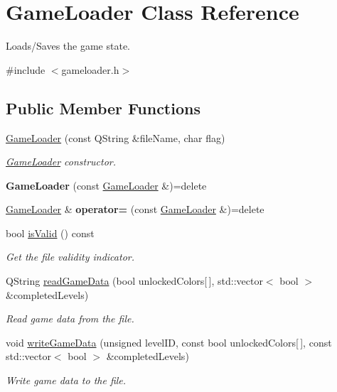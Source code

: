 \hypertarget{class_game_loader}{}\section{Game\+Loader Class Reference}
\label{class_game_loader}


Loads/\+Saves the game state.  




{\ttfamily \#include $<$gameloader.\+h$>$}

\subsection*{Public Member Functions}
\begin{DoxyCompactItemize}
\item 
\hyperlink{class_game_loader_af775cdf000a140a8a977d75ef191837d}{Game\+Loader} (const Q\+String \&file\+Name, char flag)
\begin{DoxyCompactList}\small\item\em \hyperlink{class_game_loader}{Game\+Loader} constructor. \end{DoxyCompactList}\item 
\mbox{\label{class_game_loader_ad0cd1a830dde408ea6951f3ef3237f6e}} 
{\bfseries Game\+Loader} (const \hyperlink{class_game_loader}{Game\+Loader} \&)=delete
\item 
\mbox{\label{class_game_loader_a7ffc953ad4a2ca243babdd82d95a022d}} 
\hyperlink{class_game_loader}{Game\+Loader} \& {\bfseries operator=} (const \hyperlink{class_game_loader}{Game\+Loader} \&)=delete
\item 
bool \hyperlink{class_game_loader_a80f63255ecc84d19e231fcd7069fe07f}{is\+Valid} () const
\begin{DoxyCompactList}\small\item\em Get the file validity indicator. \end{DoxyCompactList}\item 
Q\+String \hyperlink{class_game_loader_ac255d6d8ade43f4ee3e760495f58ff4a}{read\+Game\+Data} (bool unlocked\+Colors\mbox{[}$\,$\mbox{]}, std\+::vector$<$ bool $>$ \&completed\+Levels)
\begin{DoxyCompactList}\small\item\em Read game data from the file. \end{DoxyCompactList}\item 
void \hyperlink{class_game_loader_aa597ca460dd45081cfbbfc3f71a75c5a}{write\+Game\+Data} (unsigned level\+ID, const bool unlocked\+Colors\mbox{[}$\,$\mbox{]}, const std\+::vector$<$ bool $>$ \&completed\+Levels)
\begin{DoxyCompactList}\small\item\em Write game data to the file. \end{DoxyCompactList}\end{DoxyCompactItemize}


